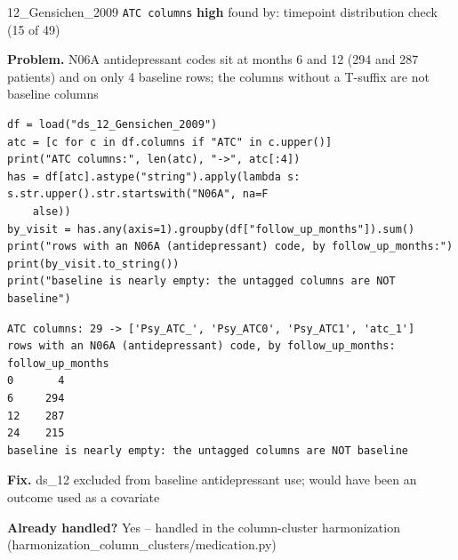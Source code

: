 \documentclass[9pt, t, handout]{beamer}
\newcommand{\ans}[1]{\textcolor{structure.fg}{#1}}
\begin{document}
\begin{frame}[fragile]{12\_Gensichen\_2009 \quad \texttt{ATC columns}}
  {\scriptsize\textcolor{orange!80!black}{\textbf{high}} \quad
   found by: timepoint distribution check \quad (15 of 49)}
  \vspace{3pt}

  {\footnotesize \textbf{Problem.} N06A antidepressant codes sit at months 6 and 12 (294 and 287 patients) and on only 4 baseline rows; the columns without a T-suffix are not baseline columns}
  \vspace{4pt}

  \begin{Verbatim}[fontsize=\tiny, frame=single, framesep=2pt, label=\tiny reproduce]
df = load("ds_12_Gensichen_2009")
atc = [c for c in df.columns if "ATC" in c.upper()]
print("ATC columns:", len(atc), "->", atc[:4])
has = df[atc].astype("string").apply(lambda s: s.str.upper().str.startswith("N06A", na=F
    alse))
by_visit = has.any(axis=1).groupby(df["follow_up_months"]).sum()
print("rows with an N06A (antidepressant) code, by follow_up_months:")
print(by_visit.to_string())
print("baseline is nearly empty: the untagged columns are NOT baseline")
  \end{Verbatim}
  \begin{Verbatim}[fontsize=\tiny, frame=single, framesep=2pt, label=\tiny output]
ATC columns: 29 -> ['Psy_ATC_', 'Psy_ATC0', 'Psy_ATC1', 'atc_1']
rows with an N06A (antidepressant) code, by follow_up_months:
follow_up_months
0       4
6     294
12    287
24    215
baseline is nearly empty: the untagged columns are NOT baseline
  \end{Verbatim}
  \vspace{2pt}

  {\footnotesize \textbf{Fix.} ds\_12 excluded from baseline antidepressant use; would have been an outcome used as a covariate}
  \vspace{2pt}

  {\footnotesize \textbf{Already handled?} \ans{Yes} -- handled in the column-cluster harmonization
   (harmonization\_column\_clusters/medication.py)}
\end{frame}
\end{document}
